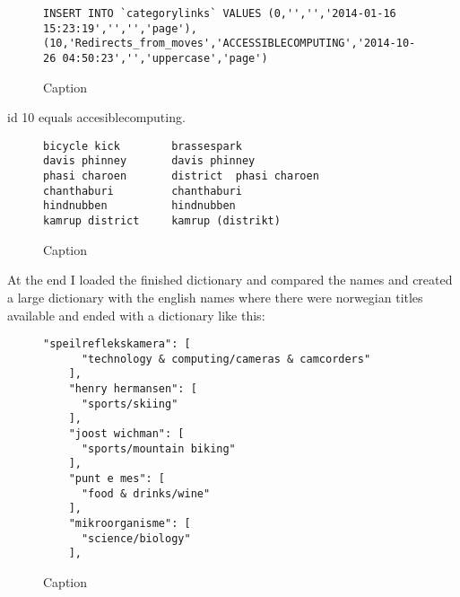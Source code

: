 \begin{figure}[h]
\centering
\begin{lstlisting}
INSERT INTO `categorylinks` VALUES (0,'','','2014-01-16 15:23:19','','','page'),(10,'Redirects_from_moves','ACCESSIBLECOMPUTING','2014-10-26 04:50:23','','uppercase','page')
\end{lstlisting}
\caption{Caption}
\label{fig:my_label}
\end{figure}
 
id 10 equals accesiblecomputing. 

\begin{figure}[h]
\centering
\begin{lstlisting}
bicycle kick        brassespark
davis phinney       davis phinney
phasi charoen       district  phasi charoen
chanthaburi         chanthaburi
hindnubben          hindnubben
kamrup district     kamrup (distrikt)
\end{lstlisting}
\caption{Caption}
\label{fig:my_label}
\end{figure}

At the end I loaded the finished dictionary and compared the names and created a large dictionary with the english names where there were norwegian titles available and ended with a dictionary like this: 

\begin{figure}[h]
\centering
\begin{lstlisting}
"speilreflekskamera": [
      "technology & computing/cameras & camcorders"
    ], 
    "henry hermansen": [
      "sports/skiing"
    ], 
    "joost wichman": [
      "sports/mountain biking"
    ], 
    "punt e mes": [
      "food & drinks/wine"
    ], 
    "mikroorganisme": [
      "science/biology"
    ], 
\end{lstlisting}
\caption{Caption}
\label{fig:my_label}
\end{figure}